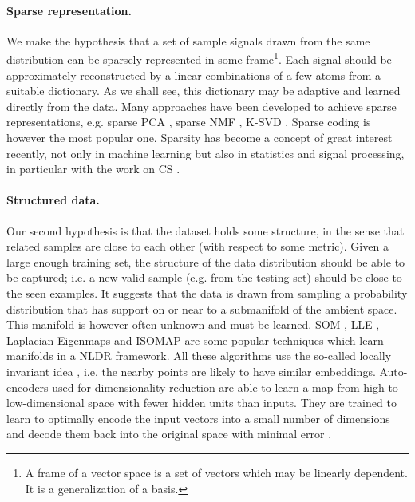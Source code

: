 \paragraph{Sparse representation.}
We make the hypothesis that a set of sample signals drawn from the same distribution can be sparsely represented in some frame\footnote{A frame of a vector space is a set of vectors which may be linearly dependent. It is a generalization of a basis.}. Each signal should be approximately reconstructed by a linear combinations of a few atoms from a suitable dictionary. As we shall see, this dictionary may be adaptive and learned directly from the data. Many approaches have been developed to achieve sparse representations, e.g. sparse \gls{PCA} \cite{aspremont2007sparsePCA}, sparse NMF \cite{hoyer2004sparseNMF}, K-SVD \cite{aharon2006KSVD}. Sparse coding \cite{olshausen1996SparseV1, mairal2008sparseCoding} is however the most popular one. Sparsity has become a concept of great interest recently, not only in machine learning but also in statistics and signal processing, in particular with the work on \gls{CS} \cite{candes2005CS, donoho2006CS}.

\paragraph{Structured data.}
Our second hypothesis is that the dataset holds some structure, in the sense that related samples are close to each other (with respect to some metric). Given a large enough training set, the structure of the data distribution should be able to be captured; i.e. a new valid sample (e.g. from the testing set) should be close to the seen examples.
It suggests that the data is drawn from sampling a probability distribution that has support on or near to a submanifold of the ambient space.
This manifold is however often unknown and must be learned. \gls{SOM} \cite{kohonen1982SOM}, \gls{LLE} \cite{roweis2000LLE}, Laplacian Eigenmaps \cite{belkin2001laplacianEigenmaps} and ISOMAP \cite{tenenbaum2000isomap} are some popular techniques which learn manifolds in a \gls{NLDR} framework. All these algorithms use the so-called locally invariant idea \cite{lecun2006invariantMapping}, i.e. the nearby points are likely to have similar embeddings. Auto-encoders used for dimensionality reduction are able to learn a map from high to low-dimensional space with fewer hidden units than inputs. They are trained to learn to optimally encode the input vectors into a small number of dimensions and decode them back into the original space with minimal error \cite{bourlard1988autoencoder}.

